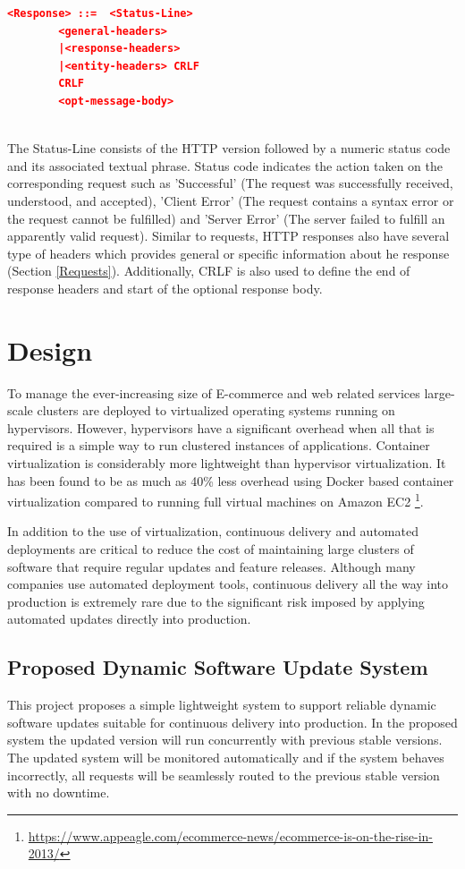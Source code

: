 \documentclass[a4paper,11pt,twoside]{article}
\begin{document}
\begin{lstlisting}[language=json,firstnumber=1]
<Response> ::=	<Status-Line>
		<general-headers>
		|<response-headers>
		|<entity-headers> CRLF
		CRLF 
		<opt-message-body>
\end{lstlisting} 
\noindent\\
The Status-Line consists of the HTTP version followed by a numeric status code and its associated textual phrase. Status code indicates the action taken on the corresponding request such as 'Successful' (The request was successfully received, understood, and accepted), 'Client Error' (The request contains a syntax error or the request cannot be fulfilled) and 'Server Error' (The server failed to fulfill an apparently valid request). Similar to requests, HTTP responses also have several type of headers which provides general or specific information about he response (Section \ref{Requests}). Additionally, CRLF is also used to define the end of response headers and start of the optional response body.   

 

\clearpage
\section{Design} \label{Design}
To manage the ever-increasing size of E-commerce and web related services large-scale clusters are deployed to virtualized operating systems running on hypervisors. However, hypervisors have a significant overhead when all that is required is a simple way to run clustered instances of applications. Container virtualization is considerably more lightweight than hypervisor virtualization. It has been found to be as much as 40\% less overhead using Docker based container virtualization compared to running full virtual machines on Amazon EC2 \footnote{\url{https://www.appeagle.com/ecommerce-news/ecommerce-is-on-the-rise-in-2013/}}.

In addition to the use of virtualization, continuous delivery and automated deployments are critical to reduce the cost of maintaining large clusters of software that require regular updates and feature releases. Although many companies use automated deployment tools, continuous delivery all the way into production is extremely rare due to the significant risk imposed by applying automated updates directly into production.

\subsection{Proposed Dynamic Software Update System}\label{modes} 
This project proposes a simple lightweight system to support reliable dynamic software updates suitable for continuous delivery into production. In the proposed system the updated version will run concurrently with previous stable versions. The updated system will be monitored automatically and if the system behaves incorrectly, all requests will be seamlessly routed to the previous stable version with no downtime.
\end{document}
